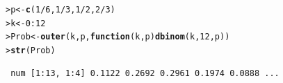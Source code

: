 \documentclass[10pt,krantz2]{krantz}\usepackage[]{graphicx}\usepackage[]{color}
\makeatletter
\newcommand{\hlnum}[1]{\textcolor[rgb]{0.686,0.059,0.569}{#1}}%
\newcommand{\hlopt}[1]{\textcolor[rgb]{0,0,0}{#1}}%
\newcommand{\hlstd}[1]{\textcolor[rgb]{0.345,0.345,0.345}{#1}}%
\newcommand{\hlkwa}[1]{\textcolor[rgb]{0.161,0.373,0.58}{\textbf{#1}}}%
\newcommand{\hlkwb}[1]{\textcolor[rgb]{0.69,0.353,0.396}{#1}}%
\newcommand{\hlkwc}[1]{\textcolor[rgb]{0.333,0.667,0.333}{#1}}%
\newcommand{\hlkwd}[1]{\textcolor[rgb]{0.737,0.353,0.396}{\textbf{#1}}}%
\newenvironment{kframe}{%
 \def\at@end@of@kframe{}%
 \ifinner\ifhmode%
  \def\at@end@of@kframe{\end{minipage}}%
  \begin{minipage}{\columnwidth}%
 \fi\fi%
 \def\FrameCommand##1{\hskip\@totalleftmargin \hskip-\fboxsep
 \colorbox{shadecolor}{##1}\hskip-\fboxsep
     \hskip-\linewidth \hskip-\@totalleftmargin \hskip\columnwidth}%
 \MakeFramed {\advance\hsize-\width
   \@totalleftmargin\z@ \linewidth\hsize
   \@setminipage}}%
 {\par\unskip\endMakeFramed%
 \at@end@of@kframe}
\newenvironment{knitrout}{}{} %
\renewenvironment{knitrout}{\small\renewcommand{\baselinestretch}{.85}}{} %
\makeatother
\begin{document}

\begin{knitrout}
\color{fgcolor}\begin{kframe}
\begin{alltt}
\hlstd{> }\hlstd{p} \hlkwb{<-} \hlkwd{c}\hlstd{(}\hlnum{1}\hlopt{/}\hlnum{6}\hlstd{,} \hlnum{1}\hlopt{/}\hlnum{3}\hlstd{,} \hlnum{1}\hlopt{/}\hlnum{2}\hlstd{,} \hlnum{2}\hlopt{/}\hlnum{3}\hlstd{)}
\hlstd{> }\hlstd{k} \hlkwb{<-} \hlnum{0} \hlopt{:} \hlnum{12}
\hlstd{> }\hlstd{Prob} \hlkwb{<-} \hlkwd{outer}\hlstd{(k, p,} \hlkwa{function}\hlstd{(}\hlkwc{k}\hlstd{,} \hlkwc{p}\hlstd{)} \hlkwd{dbinom}\hlstd{(k,} \hlnum{12}\hlstd{, p))}
\hlstd{> }\hlkwd{str}\hlstd{(Prob)}
\end{alltt}
\begin{verbatim}
 num [1:13, 1:4] 0.1122 0.2692 0.2961 0.1974 0.0888 ...
\end{verbatim}
\end{kframe}
\end{knitrout}
\end{document}
